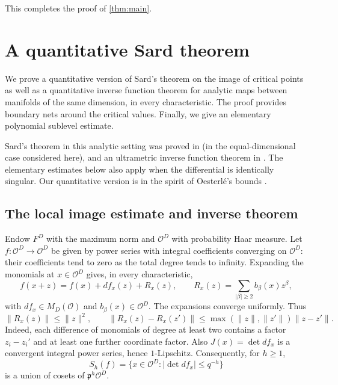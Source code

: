 \documentclass[11pt,reqno]{amsart}
\numberwithin{equation}{section}
\theoremstyle{plain}
\theoremstyle{definition}
\theoremstyle{remark}
\theoremstyle{plain}
\newcommand{\OO}{\mathcal{O}}    %
\newcommand{\pp}{\mathfrak{p}}   %
\newcommand{\bnets}{boundary nets}
\newcommand{\abs}[1]{\lvert#1\rvert}
\newcommand{\norm}[1]{\lVert#1\rVert}
\begin{document}
This completes the proof of \cref{thm:main}.

\appendix

\section{A quantitative Sard theorem}\label{sec:sard}

We prove a quantitative version of Sard's theorem on the image of critical points as well as a quantitative
inverse function theorem for analytic maps between manifolds of the same dimension, in every characteristic.
The proof provides \bnets{} around the critical values.
Finally, we give an elementary polynomial sublevel estimate.

Sard's theorem in this analytic setting was proved in
\cite[Theorem~2.5]{MR3803728} (in the equal-dimensional case considered
here), and an ultrametric inverse function theorem
in \cite[Theorem~2.4]{MR3057121}. The elementary estimates below also
apply when the differential is identically singular. Our quantitative
version is in the spirit of Oesterl\'e's bounds \cite{MR656627}.

\subsection{The local image estimate and inverse theorem}
Endow $F^D$ with the maximum norm and $\OO^D$ with probability Haar
measure. Let $f:\OO^D\to\OO^D$ be given by power series with integral
coefficients converging on $\OO^D$: their coefficients tend to zero
as the total degree tends to infinity. Expanding the monomials at
$x\in\OO^D$ gives, in every characteristic,
\begin{equation}\label{eq:taylor}
f(x+z)=f(x)+df_x(z)+R_x(z),\qquad
R_x(z)=\sum_{\abs\beta\ge2}b_\beta(x)z^\beta,
\end{equation}
with $df_x\in M_D(\OO)$ and $b_\beta(x)\in\OO^D$.
The expansions converge uniformly. Thus
\begin{equation}\label{eq:remainder}
\norm{R_x(z)}\le\norm z^2,\qquad
\norm{R_x(z)-R_x(z')}\le
\max(\norm z,\norm{z'})\norm{z-z'}.
\end{equation}
Indeed, each difference of monomials of degree at least two contains
a factor $z_i-z_i'$ and at least one further coordinate factor.
Also $J(x)=\det df_x$ is a convergent integral power series, hence
$1$-Lipschitz. Consequently, for $h\ge1$,
\begin{equation}\label{eq:Sh}
S_h(f)=\{x\in\OO^D:\abs{\det df_x}\le q^{-h}\}
\end{equation}
is a union of cosets of $\pp^h\OO^D$.
\end{document}
